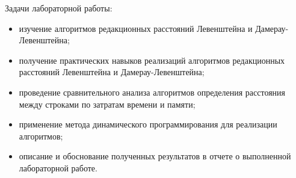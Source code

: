 Задачи лабораторной работы:
\begin{itemize}
	\item изучение алгоритмов редакционных расстояний Левенштейна и Дамерау-Левенштейна;
    \item получение практических навыков реализаций алгоритмов редакционных расстояний Левенштейна и Дамерау-Левенштейна;
    \item проведение сравнительного анализа алгоритмов определения расстояния между строками по затратам времени и памяти;
	\item применение метода динамического программирования для реализации алгоритмов;
	\item описание и обоснование полученных результатов в отчете о выполненной лабораторной работе. 
\end{itemize}
